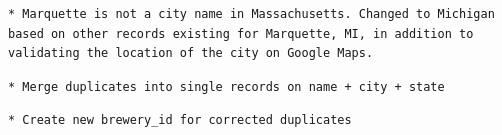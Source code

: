 \documentclass[]{article}
\newenvironment{Shaded}{\begin{snugshade}}{\end{snugshade}}
\newcommand{\KeywordTok}[1]{\textcolor[rgb]{0.13,0.29,0.53}{\textbf{#1}}}
\newcommand{\DataTypeTok}[1]{\textcolor[rgb]{0.13,0.29,0.53}{#1}}
\newcommand{\DecValTok}[1]{\textcolor[rgb]{0.00,0.00,0.81}{#1}}
\newcommand{\StringTok}[1]{\textcolor[rgb]{0.31,0.60,0.02}{#1}}
\newcommand{\CommentTok}[1]{\textcolor[rgb]{0.56,0.35,0.01}{\textit{#1}}}
\newcommand{\OperatorTok}[1]{\textcolor[rgb]{0.81,0.36,0.00}{\textbf{#1}}}
\newcommand{\NormalTok}[1]{#1}
\begin{document}
\begin{verbatim}
* Marquette is not a city name in Massachusetts. Changed to Michigan based on other records existing for Marquette, MI, in addition to validating the location of the city on Google Maps.
\end{verbatim}

\begin{Shaded}
\end{Shaded}

\begin{verbatim}
* Merge duplicates into single records on name + city + state
\end{verbatim}

\begin{Shaded}
\end{Shaded}

\begin{verbatim}
* Create new brewery_id for corrected duplicates
\end{verbatim}
\end{document}
